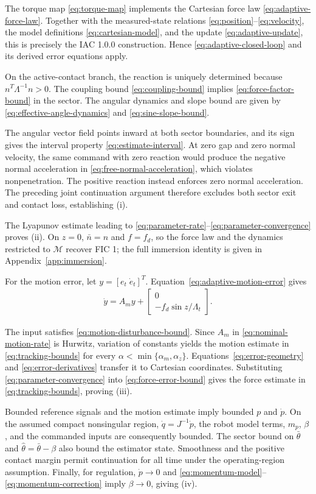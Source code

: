 \documentclass[10pt,journal,letterpaper]{IEEEtran}
\begin{document}
\begin{IEEEproof}
The torque map \eqref{eq:torque-map} implements the Cartesian force law \eqref{eq:adaptive-force-law}. Together with the measured-state relations \eqref{eq:position}--\eqref{eq:velocity}, the model definitions \eqref{eq:cartesian-model}, and the update \eqref{eq:adaptive-update}, this is precisely the IAC 1.0.0 construction. Hence \eqref{eq:adaptive-closed-loop} and its derived error equations apply.

On the active-contact branch, the reaction is uniquely determined because $n^T\Lambda^{-1}n>0$. The coupling bound \eqref{eq:coupling-bound} implies \eqref{eq:force-factor-bound} in the sector. The angular dynamics and slope bound are given by \eqref{eq:effective-angle-dynamics} and \eqref{eq:sine-slope-bound}.

The angular vector field points inward at both sector boundaries, and its sign gives the interval property \eqref{eq:estimate-interval}. At zero gap and zero normal velocity, the same command with zero reaction would produce the negative normal acceleration in \eqref{eq:free-normal-acceleration}, which violates nonpenetration. The positive reaction instead enforces zero normal acceleration. The preceding joint continuation argument therefore excludes both sector exit and contact loss, establishing (i).

The Lyapunov estimate leading to \eqref{eq:parameter-rate}--\eqref{eq:parameter-convergence} proves (ii). On $z=0$, $\bar n=n$ and $f=f_d$, so the force law and the dynamics restricted to $\mathcal M$ recover FIC 1; the full immersion identity is given in Appendix~\ref{app:immersion}.

For the motion error, let $y=[e_t\;\dot e_t]^T$. Equation~\eqref{eq:adaptive-motion-error} gives
\begin{align*}
\dot y=A_my+
\begin{bmatrix}0\\-f_d\sin z/\Lambda_t\end{bmatrix}.
\end{align*}

The input satisfies \eqref{eq:motion-disturbance-bound}. Since $A_m$ in \eqref{eq:nominal-motion-rate} is Hurwitz, variation of constants yields the motion estimate in \eqref{eq:tracking-bounds} for every $\alpha<\min\{\alpha_m,\alpha_z\}$. Equations~\eqref{eq:error-geometry} and \eqref{eq:error-derivatives} transfer it to Cartesian coordinates. Substituting \eqref{eq:parameter-convergence} into \eqref{eq:force-error-bound} gives the force estimate in \eqref{eq:tracking-bounds}, proving (iii).

Bounded reference signals and the motion estimate imply bounded $p$ and $\dot p$. On the assumed compact nonsingular region, $\dot q=J^{-1}\dot p$, the robot model terms, $m_p$, $\beta$, and the commanded inputs are consequently bounded. The sector bound on $\bar\theta$ and $\hat\theta=\bar\theta-\beta$ also bound the estimator state. Smoothness and the positive contact margin permit continuation for all time under the operating-region assumption. Finally, for regulation, $\dot p\to0$ and \eqref{eq:momentum-model}--\eqref{eq:momentum-correction} imply $\beta\to0$, giving (iv). \end{IEEEproof}
\end{document}
